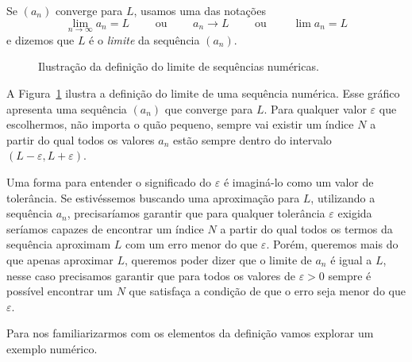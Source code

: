 Se $(a_n)$ converge para $L$, usamos uma das notações
\[
  \lim_{n\to \infty} a_n = L       \qquad\text{ ou }\qquad
  a_n \to L                        \qquad\text{ ou }\qquad
  \lim a_n = L
\]
e dizemos que $L$ é o
\emph{limite}
da sequência $(a_n)$.

\begin{figure}
  \centering
  
  \caption{Ilustração da definição do limite de sequências numéricas.}
  \label{fig:sequencia_limite}
\end{figure}

A Figura~\ref{fig:sequencia_limite} ilustra a definição do limite de uma
sequência numérica.
Esse gráfico apresenta uma sequência $(a_n)$ que converge para $L$.
Para qualquer valor $\varepsilon$ que escolhermos, não
importa o quão pequeno, sempre vai existir um índice $N$ a partir
do qual todos os valores $a_n$
estão sempre dentro do intervalo $(L-\varepsilon, L+\varepsilon)$.

Uma forma para entender o significado do $\varepsilon$ é imaginá-lo como um valor
de tolerância. Se estivéssemos buscando uma aproximação para $L$, utilizando a
sequência $a_n$, precisaríamos garantir que para qualquer tolerância $\varepsilon$
exigida seríamos capazes de encontrar um índice $N$ a partir do qual todos os
termos da sequência aproximam $L$ com um erro menor do que $\varepsilon$.
Porém, queremos mais do que apenas aproximar $L$, queremos poder dizer que o limite
de $a_n$ é igual a $L$, nesse caso precisamos garantir que para todos os valores de
$\varepsilon>0$ sempre é possível encontrar um $N$ que satisfaça a condição de que o
erro seja menor do que $\varepsilon$.

Para nos familiarizarmos com os elementos da definição vamos explorar um
exemplo numérico.

